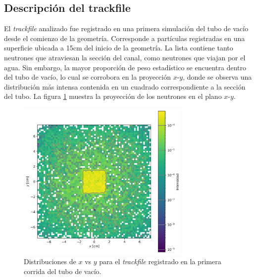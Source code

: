 
\subsection{Descripción del trackfile}

El \emph{trackfile} analizado fue registrado en una primera simulación del tubo de vacío desde el comienzo de la geometría. Corresponde a partículas registradas en una superficie ubicada a 15cm del inicio de la geometría. La lista contiene tanto neutrones que atraviesan la sección del canal, como neutrones que viajan por el agua. Sin embargo, la mayor proporción de peso estadístico se encuentra dentro del tubo de vacío, lo cual se corrobora en la proyección $x$-$y$, donde se observa una distribución más intensa contenida en un cuadrado correspondiente a la sección del tubo. La figura \ref{fig:trackfile1_x_y} muestra la proyección de los neutrones en el plano $x$-$y$.

\begin{figure}[H]
    \centering
    \includegraphics[width=0.75\textwidth]{figs/fig4_1.png}
    \caption{Distribuciones de $x$ vs $y$ para el \emph{trackfile} registrado en la primera corrida del tubo de vacío.}
    \label{fig:trackfile1_x_y}
\end{figure}

